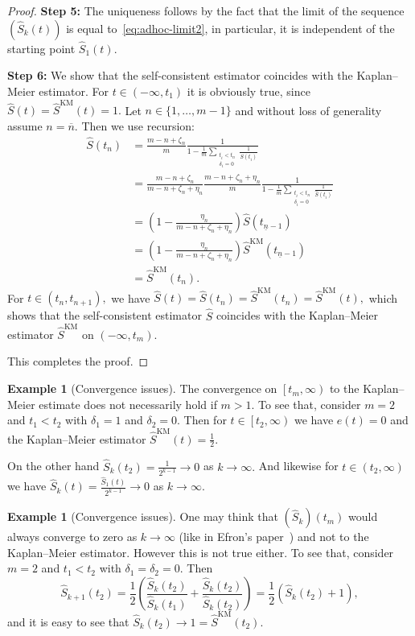 \documentclass{amsart}
\theoremstyle{plain}
\theoremstyle{definition}
\newtheorem{exa}[thm]{Example}
\def\l{\left}
\def\r{\right}
\def\half{\frac{1}{2}}
\newcommand{\rec}[1]{\frac{1}{#1}}
\def\un{\underline{n}}
\def\on{\overline{n}}
\renewcommand{\hat}{\widehat}
\begin{document}
\begin{proof}
\textbf{Step 5:} The uniqueness follows by the fact that the limit of the sequence $\l(\hat{S}_k(t)\r)$ is equal to~\eqref{eq:adhoc-limit2}, in particular, it is independent of the starting point $\hat{S}_1(t).$

\textbf{Step 6:} We show that the self-consistent estimator coincides with the Kaplan--Meier estimator. For $t\in\l(-\infty,t_1\r)$ it is obviously true, since $\hat{S}(t)=\hat{S}^\textrm{KM}(t)=1.$ Let $n\in\{1,\dots, m-1\}$ and without loss of generality assume $n=\on.$ Then we use recursion:
\begin{align*}
 \hat{S}\l(t_n\r) &  =\frac{m-n+\zeta_n}{m} \rec{1-\rec{m}\sum_{\substack{t_i< t_n \\ \delta_i=0}}\rec{\hat{S}\l(t_i\r)}} \\ & = \frac{m-n+\zeta_n}{m-n+\zeta_n+\eta_n} \frac{m-n+\zeta_n+\eta_n}{m} \rec{1-\rec{m}\sum_{\substack{t_i< t_n \\ \delta_i=0}}\rec{\hat{S}\l(t_i\r)}} \\  & = \l(1-\frac{\eta_n}{m-n+\zeta_n+\eta_n}\r)  \hat{S}\l(t_{\un-1}\r) \\ & = \l(1-\frac{\eta_n}{m-n+\zeta_n+\eta_n}\r) \hat{S}^\textrm{KM}\l(t_{\un-1}\r) \\ & = \hat{S}^\textrm{KM}\l(t_n\r).
\end{align*}
For $t\in\l(t_n,t_{n+1}\r),$ we have $\hat{S}(t)=\hat{S}\l(t_n\r)=\hat{S}^\textrm{KM}\l(t_n\r)=\hat{S}^\textrm{KM}(t),$ which shows that the self-consistent estimator $\hat{S}$ coincides with the Kaplan--Meier estimator $\hat{S}^\textrm{KM}$ on $\l(-\infty,t_m\r).$ 

This completes the proof.
\end{proof}
 
 
\begin{exa}[Convergence issues]
 The convergence on $\l[t_m,\infty\r)$ to the Kaplan--Meier estimate does not necessarily hold if $m>1.$ To see that, consider $m=2$ and $t_1<t_2$ with $\delta_1=1$ and $\delta_2=0.$ Then for $t\in\l[t_2,\infty\r)$ we have $e(t)=0$ and the Kaplan--Meier estimator $\hat{S}^\textrm{KM}(t)=\half.$ 
 
On the other hand $\hat{S}_k\l(t_2\r)=\rec{2^{k-1}}\to0$ as $k\to\infty.$ And likewise for $t\in\l(t_2,\infty\r)$ we have $\hat{S}_k\l(t\r)=\frac{\hat{S}_1(t)}{2^{k-1}}\to0$ as $k\to\infty.$
\end{exa}

\begin{exa}[Convergence issues]
 One may think that $\l(\hat{S}_k\r)\l(t_m\r)$ would always converge to zero as $k\to\infty$ (like in Efron's paper~\cite[(7.7)]{efron}) and not to the Kaplan--Meier estimator. However this is not true either. To see that, consider $m=2$  and $t_1<t_2$ with $\delta_1=\delta_2=0.$ Then
\begin{equation*}
 \hat{S}_{k+1}\l(t_2\r) =\half\l(\frac{\hat{S}_k\l(t_2\r)}{\hat{S}_k\l(t_1\r)}+\frac{\hat{S}_k\l(t_2\r)}{\hat{S}_k\l(t_2\r)}  \r)=\half\l(\hat{S}_k\l(t_2\r)+1  \r),
\end{equation*}
 and it is easy to see that $\hat{S}_k\l(t_2\r)\to 1 = \hat{S}^\textrm{KM}\l(t_2\r).$
\end{exa}
 
\end{document}

